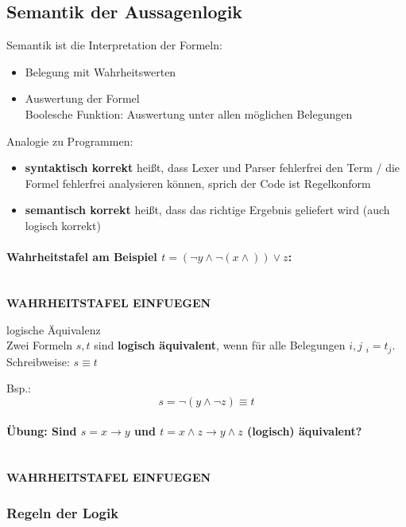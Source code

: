\documentclass[10pt,a4paper]{article}
\begin{document}
\subsection{Semantik der Aussagenlogik}
%
Semantik ist die Interpretation der Formeln:
\begin{itemize}
\item Belegung mit Wahrheitswerten
\item Auswertung der Formel\\
Boolesche Funktion: Auswertung unter allen möglichen Belegungen
\end{itemize}
Analogie zu Programmen:
\begin{itemize}
\item \textbf{syntaktisch korrekt} heißt, dass Lexer und Parser fehlerfrei den Term / die Formel fehlerfrei analysieren können, sprich der Code ist Regelkonform
\item \textbf{semantisch korrekt} heißt, dass das richtige Ergebnis geliefert wird (auch logisch korrekt)
\end{itemize}
%
\paragraph{Wahrheitstafel am Beispiel $t = (\neg y \land \neg(x \land) ) \lor z$:}
\ \\ \textbf{WAHRHEITSTAFEL EINFUEGEN}
%
\begin{defi}{logische Äquivalenz}
\\Zwei Formeln $s,t$ sind \textbf{logisch äquivalent}, wenn für alle Belegungen $i,j$ $_i = t_j$.\\
Schreibweise: $s \equiv t$

Bsp.:
\[ s = \neg( y \land \neg z ) \equiv t \]
\end{defi}
%
\paragraph{Übung: Sind $s = x \rightarrow y$ und $t = x \land z \rightarrow y \land z$ (logisch) äquivalent?}
\ \\ \textbf{WAHRHEITSTAFEL EINFUEGEN}
%
\subsubsection{Regeln der Logik}
\end{document}
